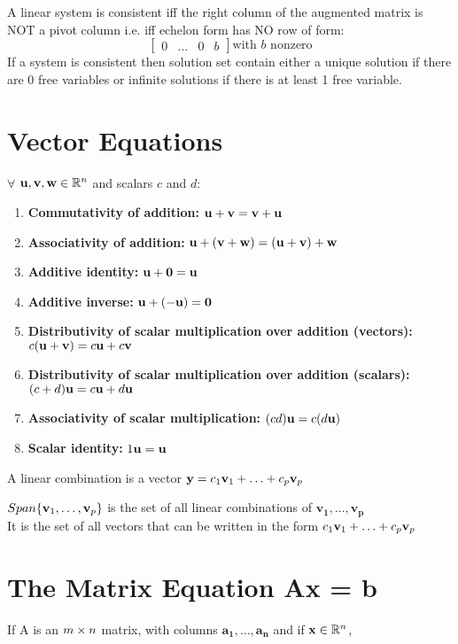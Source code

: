\documentclass{report}
\begin{document}
A linear system is consistent iff the right column of the augmented matrix is NOT a pivot column
i.e. iff echelon form has NO row of form:
\[\begin{bmatrix}
    0 & \ldots & 0 & b
\end{bmatrix} \text{with $b$ nonzero}
\]
If a system is consistent then solution set contain either a unique solution if there are 0 free variables
or infinite solutions if there is at least 1 free variable.

\section{Vector Equations}
\begin{tcolorbox}[colback=blue!5!white, colframe=blue!75!black, title=Algebraic Properties of Vectors in $\Rn$]
$\forall$ $\mathbf{u}, \mathbf{v}, \mathbf{w} \in \mathbb{R}^n$ and scalars $c$ and $d$:
\begin{enumerate}
    \item \textbf{Commutativity of addition:} $\mathbf{u} + \mathbf{v} = \mathbf{v} + \mathbf{u}$
    \item \textbf{Associativity of addition:} $\mathbf{u} + (\mathbf{v} + \mathbf{w}) = (\mathbf{u} + \mathbf{v}) + \mathbf{w}$
    \item \textbf{Additive identity:} $\mathbf{u} + \mathbf{0} = \mathbf{u}$
    \item \textbf{Additive inverse:} $\mathbf{u} + (-\mathbf{u}) = \mathbf{0}$
    \item \textbf{Distributivity of scalar multiplication over addition (vectors):} $c(\mathbf{u} + \mathbf{v}) = c\mathbf{u} + c\mathbf{v}$
    \item \textbf{Distributivity of scalar multiplication over addition (scalars):} $(c + d)\mathbf{u} = c\mathbf{u} + d\mathbf{u}$
    \item \textbf{Associativity of scalar multiplication:} $(cd)\mathbf{u} = c(d\mathbf{u})$
    \item \textbf{Scalar identity:} $1 \mathbf{u} = \mathbf{u}$
\end{enumerate}
\end{tcolorbox}
    
A linear combination is a vector $\mathbf{y} = c_1\mathbf{v}_1 + \ldots + c_p\mathbf{v}_p$

\begin{definition}
    $Span\{\mathbf{v}_1, \ldots, \mathbf{v}_p\}$ is the set of all linear combinations of $\mathbf{v_1}, \ldots, \mathbf{v_p}$
    \\It is the set of all vectors that can be written in the form $c_1\mathbf{v}_1 + \ldots + c_p\mathbf{v}_p$
\end{definition}

\section{The Matrix Equation Ax = b}
\begin{definition}
\end{definition}
If A is an $m \times n$ matrix, with columns $\mathbf{a_1}, \ldots, \mathbf{a_n}$ and if $\mathbf{x} \in \mathbb{R}^n$,
\end{document}
